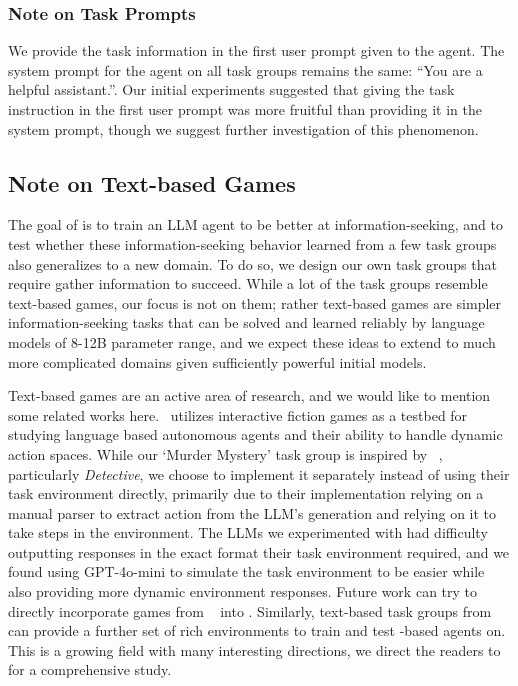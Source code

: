 \subsubsection{Note on Task Prompts}

We provide the task information in the first user prompt given to the agent. The system prompt for the agent on all task groups remains the same: ``You are a helpful assistant.''. Our initial experiments suggested that giving the task instruction in the first user prompt was more fruitful than providing it in the system prompt, though we suggest further investigation of this phenomenon.

\subsection{Note on Text-based Games}

The goal of \ours{} is to train an LLM agent to be better at information-seeking, and to test whether these information-seeking behavior learned from a few task groups also generalizes to a new domain. To do so, we design our own task groups that require gather information to succeed. While a lot of the task groups resemble text-based games, our focus is not on them; rather text-based games are simpler information-seeking tasks that can be solved and learned reliably by language models of 8-12B parameter range, and we expect these ideas to extend to much more complicated domains given sufficiently powerful initial models.

Text-based games are an active area of research, and we would like to mention some related works here.~\citet{hausknecht2020interactivefictiongamescolossal} utilizes interactive fiction games as a testbed for studying language based autonomous agents and their ability to handle dynamic action spaces. While our `Murder Mystery' task group is inspired by ~\citet{hausknecht2020interactivefictiongamescolossal}, particularly \textit{Detective}, we choose to implement it separately instead of using their task environment directly, primarily due to their implementation relying on a manual parser to extract action from the LLM's generation and relying on it to take steps in the environment. The LLMs we experimented with had difficulty outputting responses in the exact format their task environment required, and we found using GPT-4o-mini to simulate the task environment to be easier while also providing more dynamic environment responses. Future work can try to directly incorporate games from ~\citet{hausknecht2020interactivefictiongamescolossal} into \ours{}. Similarly, text-based task groups from~\citet{côté2019textworldlearningenvironmenttextbased,wang2022scienceworldagentsmarter5th,jansen2024discoveryworldvirtualenvironmentdeveloping} can provide a further set of rich environments to train and test \ours{}-based agents on. This is a growing field with many interesting directions, we direct the readers to~\citet{jansen2021systematicsurveytextworlds} for a comprehensive study.

